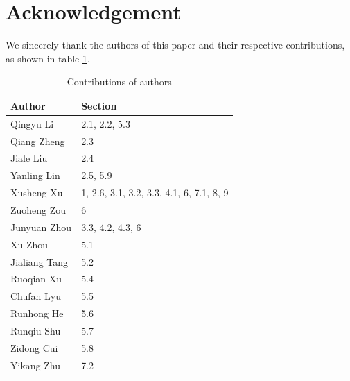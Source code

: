 \documentclass[pra,twocolumn,superscriptaddress,floatfix,nofootinbib,amsmath,amssymb]{revtex4-1}
\numberwithin{equation}{section}
\numberwithin{figure}{section}
\numberwithin{table}{section}
\begin{document}
\section{Acknowledgement}
\label{sec:acknowledgement}
We sincerely thank the authors of this paper and their respective contributions, as shown in table \ref{tab:contributions}.

\begin{table}[ht]
    \begin{tabular}{|p{3cm}|p{3cm}|}
        \toprule
        Author        & Section                                        \\
        \midrule
        Qingyu Li     & 2.1, 2.2, 5.3                                  \\
        Qiang Zheng   & 2.3                                            \\
        Jiale Liu     & 2.4                                            \\
        Yanling Lin   & 2.5, 5.9                                       \\
        Xusheng Xu    & 1, 2.6, 3.1, 3.2, 3.3, 4.1, 6, 7.1, 8, 9       \\
        Zuoheng Zou   & 6                                               \\
        Junyuan Zhou  & 3.3, 4.2, 4.3, 6                                \\
        Xu Zhou       & 5.1                                            \\
        Jialiang Tang & 5.2                                            \\
        Ruoqian Xu    & 5.4                                            \\
        Chufan Lyu    & 5.5                                            \\
        Runhong He    & 5.6                                            \\
        Runqiu Shu    & 5.7                                            \\
        Zidong Cui    & 5.8                                            \\
        Yikang Zhu    & 7.2                                            \\
        \bottomrule
    \end{tabular}
    \caption{Contributions of authors}
    \label{tab:contributions}
\end{table}
\end{document}
